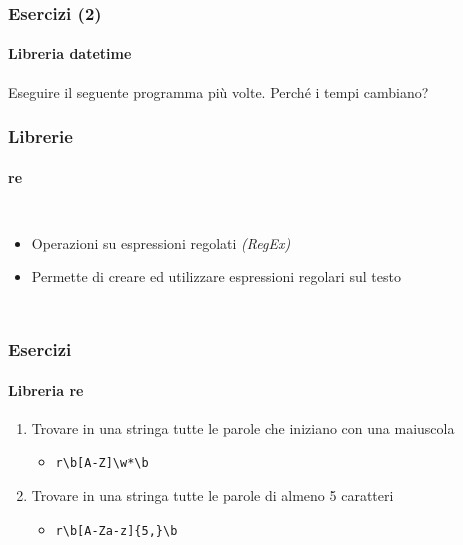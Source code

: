 \begin{exerciseframe}
    \frametitle{Esercizi (2)}
    \framesubtitle{Libreria datetime}

    Eseguire il seguente programma più volte. Perché i tempi cambiano?

    \medskip
\end{exerciseframe}

\begin{contentframe}
    \frametitle{Librerie}
    \framesubtitle{re}

    \begin{columns}
        \begin{itemize}
            \item Operazioni su espressioni regolati \textit{(RegEx)}
            \bigskip
            \item Permette di creare ed utilizzare espressioni regolari sul testo
        \end{itemize}
        
        \centering
    \end{columns}
\end{contentframe}

\begin{exerciseframe}
    \frametitle{Esercizi}
    \framesubtitle{Libreria re}

    \begin{enumerate}
        \item Trovare in una stringa tutte le parole che iniziano con una maiuscola
        \begin{itemize}
            \item \texttt{r\textquotesingle{}\textbackslash{}b[A-Z]\textbackslash{}w*\textbackslash{}b\textquotesingle{}}
        \end{itemize}
        
        \pause
        \bigskip
        \item Trovare in una stringa tutte le parole di almeno 5 caratteri
        \begin{itemize}
            \item \texttt{r\textquotesingle{}\textbackslash{}b[A-Za-z]\{5,\}\textbackslash{}b\textquotesingle{}}
        \end{itemize}
    \end{enumerate}
\end{exerciseframe}

